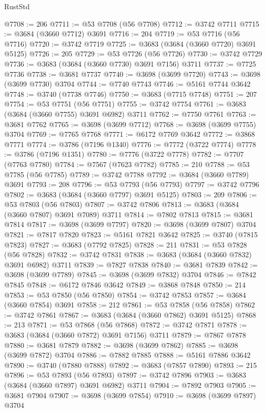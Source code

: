 \begin{lexlean}{RustStd}
\begin{coremodule}
{\begin{coremodule}
{{{{{{{{{{{{{{{{{{{{{{{{{{{{{{{{{{{{{{{{{{{{{{{@7708 := 206
@7711 := @53 @7708 (@56 @7708)
@7712 := @3742 @7711
@7715 := @3684 (@3660 @7712) @3691
@7716 := 204
@7719 := @53 @7716 (@56 @7716)
@7720 := @3742 @7719
@7725 := @3683 (@3684 (@3660 @7720) @3691 @5125)
@7726 := 205
@7729 := @53 @7726 (@56 @7726)
@7730 := @3742 @7729
@7736 := @3683 (@3684 (@3660 @7730) @3691 @7156) @3711
@7737 := @7725 @7736
@7738 := @3681 @7737
@7740 := @3698 (@3699 @7720)
@7743 := @3698 (@3699 @7730) @3704
@7744 := @7740 @7743
@7746 := @5161 @7744 @3642
@7748 := @3740 (@7738 @7746)
@7750 := @3683 (@7715 @7748)
@7751 := 207
@7754 := @53 @7751 (@56 @7751)
@7755 := @3742 @7754
@7761 := @3683 (@3684 (@3660 @7755) @3691 @6982) @3711
@7762 := @7750 @7761
@7763 := @3681 @7762
@7765 := @3698 (@3699 @7712)
@7768 := @3698 (@3699 @7755) @3704
@7769 := @7765 @7768
@7771 := @6172 @7769 @3642
@7772 := @3868 @7771
@7774 := @3786 (@7196 @1340)
@7776 := @7772 (@3722 @7774)
@7778 := @3786 (@7196 @1351)
@7780 := @7776 (@3722 @7778)
@7782 := @7707 (@7763 @7780)
@7784 := @7567 (@7623 @7782)
@7785 := 210
@7788 := @53 @7785 (@56 @7785)
@7789 := @3742 @7788
@7792 := @3684 (@3660 @7789) @3691
@7793 := 208
@7796 := @53 @7793 (@56 @7793)
@7797 := @3742 @7796
@7802 := @3683 (@3684 (@3660 @7797) @3691 @5125)
@7803 := 209
@7806 := @53 @7803 (@56 @7803)
@7807 := @3742 @7806
@7813 := @3683 (@3684 (@3660 @7807) @3691 @7089) @3711
@7814 := @7802 @7813
@7815 := @3681 @7814
@7817 := @3698 (@3699 @7797)
@7820 := @3698 (@3699 @7807) @3704
@7821 := @7817 @7820
@7823 := @5161 @7821 @3642
@7825 := @3740 (@7815 @7823)
@7827 := @3683 (@7792 @7825)
@7828 := 211
@7831 := @53 @7828 (@56 @7828)
@7832 := @3742 @7831
@7838 := @3683 (@3684 (@3660 @7832) @3691 @6982) @3711
@7839 := @7827 @7838
@7840 := @3681 @7839
@7842 := @3698 (@3699 @7789)
@7845 := @3698 (@3699 @7832) @3704
@7846 := @7842 @7845
@7848 := @6172 @7846 @3642
@7849 := @3868 @7848
@7850 := 214
@7853 := @53 @7850 (@56 @7850)
@7854 := @3742 @7853
@7857 := @3684 (@3660 @7854) @3691
@7858 := 212
@7861 := @53 @7858 (@56 @7858)
@7862 := @3742 @7861
@7867 := @3683 (@3684 (@3660 @7862) @3691 @5125)
@7868 := 213
@7871 := @53 @7868 (@56 @7868)
@7872 := @3742 @7871
@7878 := @3683 (@3684 (@3660 @7872) @3691 @7156) @3711
@7879 := @7867 @7878
@7880 := @3681 @7879
@7882 := @3698 (@3699 @7862)
@7885 := @3698 (@3699 @7872) @3704
@7886 := @7882 @7885
@7888 := @5161 @7886 @3642
@7890 := @3740 (@7880 @7888)
@7892 := @3683 (@7857 @7890)
@7893 := 215
@7896 := @53 @7893 (@56 @7893)
@7897 := @3742 @7896
@7903 := @3683 (@3684 (@3660 @7897) @3691 @6982) @3711
@7904 := @7892 @7903
@7905 := @3681 @7904
@7907 := @3698 (@3699 @7854)
@7910 := @3698 (@3699 @7897) @3704
}}}}}}}}}}}}}}}}}}}}}}}}}}}}}}}}}}}}}}}}}}}}}}}
\end{coremodule}}
\end{coremodule}
\end{lexlean}
